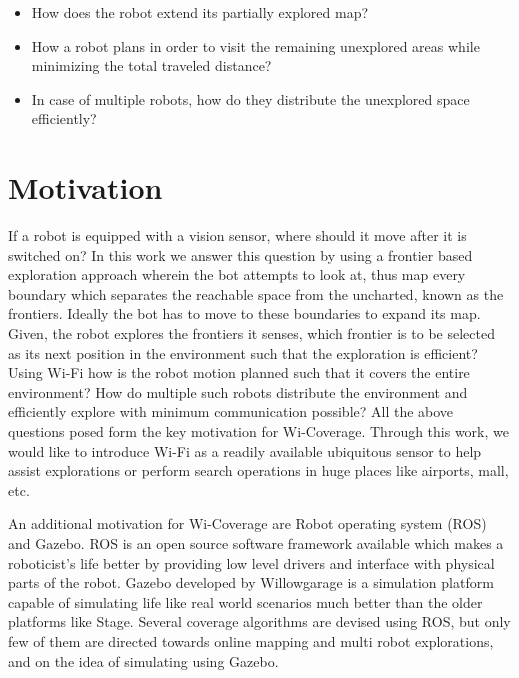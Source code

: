 \begin{itemize}
    \item How does the robot extend its partially explored map?
    \item How a robot plans in order to visit the remaining unexplored areas while minimizing the total traveled distance?
    \item In case of multiple robots, how do they distribute the unexplored space efficiently?
\end{itemize}

\section{Motivation}
If a robot is equipped with a vision sensor, where should it move after it is switched on? In this work we answer this question by using a frontier based exploration approach wherein the bot attempts to look at, thus map every boundary which separates the reachable space from the uncharted, known as the frontiers. Ideally the bot has to move to these boundaries to expand its map. Given, the robot explores the frontiers it senses, which frontier is to be selected as its next position in the environment such that the exploration is efficient? Using Wi-Fi how is the robot motion planned such that it covers the entire environment? How do multiple such robots distribute the environment and efficiently explore with minimum communication possible? All the above questions posed form the key motivation for Wi-Coverage. Through this work, we would like to introduce Wi-Fi as a readily available ubiquitous sensor to help assist explorations or perform search operations in huge places like airports, mall, etc.
\par An additional motivation for Wi-Coverage are Robot operating system (ROS) and Gazebo. ROS is an open source software framework available which makes a roboticist's life better by providing low level drivers and interface with physical parts of the robot. Gazebo developed by Willowgarage is a simulation platform capable of simulating life like real world scenarios much better than the older platforms like Stage. Several coverage algorithms are devised using ROS, but only few of them are directed towards online mapping and multi robot explorations, and on the idea of simulating using Gazebo. 

